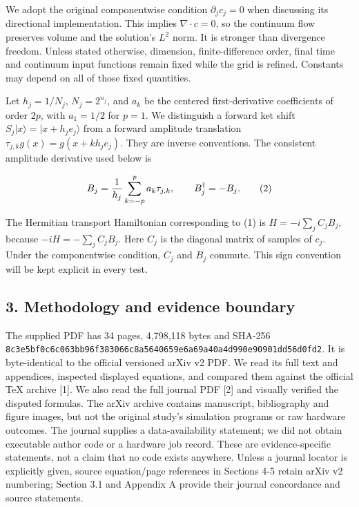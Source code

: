 We adopt the original componentwise condition \(\partial_j c_j=0\) when
discussing its directional implementation. This implies
\(\nabla\cdot c=0\), so the continuum flow preserves volume and the
solution's \(L^2\) norm. It is stronger than divergence freedom. Unless
stated otherwise, dimension, finite-difference order, final time and
continuum input functions remain fixed while the grid is refined.
Constants may depend on all of those fixed quantities.

Let \(h_j=1/N_j\), \(N_j=2^{n_j}\), and \(a_k\) be the centered
first-derivative coefficients of order \(2p\), with \(a_1=1/2\) for
\(p=1\). We distinguish a forward ket shift
\(S_j|x\rangle=|x+h_j e_j\rangle\) from a forward amplitude translation
\(\tau_{j,k}g(x)=g(x+kh_j e_j)\). They are inverse conventions. The
consistent amplitude derivative used below is

\[
B_j={1\over h_j}\sum_{k=-p}^{p}a_k\tau_{j,k},\qquad B_j^\dagger=-B_j. \tag{2}
\]

The Hermitian transport Hamiltonian corresponding to (1) is
\(H=-i\sum_j C_jB_j\), because \(-iH=-\sum_j C_jB_j\). Here \(C_j\) is
the diagonal matrix of samples of \(c_j\). Under the componentwise
condition, \(C_j\) and \(B_j\) commute. This sign convention will be
kept explicit in every test.

\subsection{3. Methodology and evidence
boundary}\label{methodology-and-evidence-boundary}

The supplied PDF has 34 pages, 4,798,118 bytes and SHA-256
\nolinkurl{8c3e5bf0c6c063bb96f383066c8a5640659e6a69a40a4d990e90901dd56d0fd2}.
It is byte-identical to the official versioned arXiv v2 PDF. We read its
full text and appendices, inspected displayed equations, and compared
them against the official TeX archive {[}1{]}. We also read the full
journal PDF {[}2{]} and visually verified the disputed formulas. The
arXiv archive contains manuscript, bibliography and figure images, but
not the original study's simulation programs or raw hardware outcomes.
The journal supplies a data-availability statement; we did not obtain
executable author code or a hardware job record. These are
evidence-specific statements, not a claim that no code exists anywhere.
Unless a journal locator is explicitly given, source equation/page
references in Sections 4-5 retain arXiv v2 numbering; Section 3.1 and
Appendix A provide their journal concordance and source statements.

